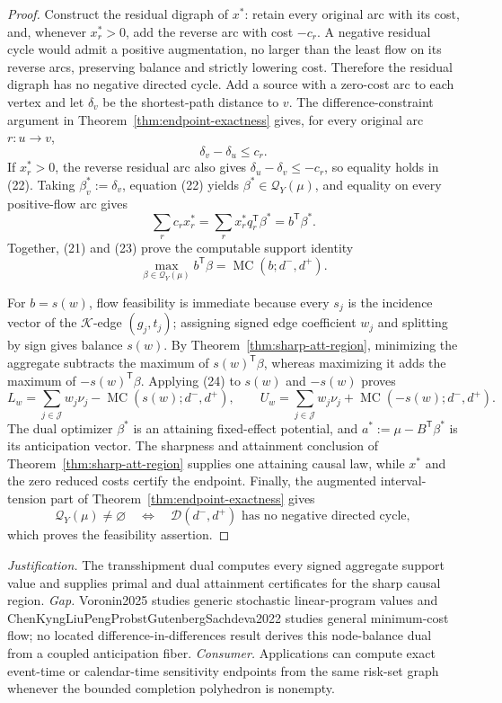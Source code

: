 \documentclass{article}
\begin{document}
\begin{proof}
Construct the residual digraph of \(x^*\): retain every original arc with its cost, and, whenever \(x_r^*>0\), add the reverse arc with cost \(-c_r\).  A negative residual cycle would admit a positive augmentation, no larger than the least flow on its reverse arcs, preserving balance and strictly lowering cost.  Therefore the residual digraph has no negative directed cycle.  Add a source with a zero-cost arc to each vertex and let \(\delta_v\) be the shortest-path distance to \(v\).  The difference-constraint argument in Theorem~\ref{thm:endpoint-exactness} gives, for every original arc \(r:u\to v\),
\[
 \delta_v-\delta_u\le c_r.
\tag{22}
\]
If \(x_r^*>0\), the reverse residual arc also gives \(\delta_u-\delta_v\le-c_r\), so equality holds in (22).  Taking \(\beta_v^*:=\delta_v\), equation (22) yields \(\beta^*\in\mathcal Q_Y(\mu)\), and equality on every positive-flow arc gives
\[
 \sum_r c_rx_r^*
 =\sum_r x_r^*q_r^{\mathsf T}\beta^*
 =b^{\mathsf T}\beta^*.
\tag{23}
\]
Together, (21) and (23) prove the computable support identity
\[
 \max_{\beta\in\mathcal Q_Y(\mu)}b^{\mathsf T}\beta
 =\operatorname{MC}(b;d^-,d^+).
\tag{24}
\]

For \(b=s(w)\), flow feasibility is immediate because every \(s_j\) is the incidence vector of the \(\mathcal K\)-edge \((g_j,t_j)\); assigning signed edge coefficient \(w_j\) and splitting by sign gives balance \(s(w)\).  By Theorem~\ref{thm:sharp-att-region}, minimizing the aggregate subtracts the maximum of \(s(w)^{\mathsf T}\beta\), whereas maximizing it adds the maximum of \(-s(w)^{\mathsf T}\beta\).  Applying (24) to \(s(w)\) and \(-s(w)\) proves
\[
 L_w=\sum_{j\in\mathcal J}w_j\nu_j-
 \operatorname{MC}(s(w);d^-,d^+),
 \qquad
 U_w=\sum_{j\in\mathcal J}w_j\nu_j+
 \operatorname{MC}(-s(w);d^-,d^+).
\tag{25}
\]
The dual optimizer \(\beta^*\) is an attaining fixed-effect potential, and \(a^*:=\mu-B^{\mathsf T}\beta^*\) is its anticipation vector.  The sharpness and attainment conclusion of Theorem~\ref{thm:sharp-att-region} supplies one attaining causal law, while \(x^*\) and the zero reduced costs certify the endpoint.  Finally, the augmented interval-tension part of Theorem~\ref{thm:endpoint-exactness} gives
\[
 \mathcal Q_Y(\mu)\ne\varnothing
 \quad\Longleftrightarrow\quad
 \mathcal D(d^-,d^+)\text{ has no negative directed cycle},
\]
which proves the feasibility assertion.
\end{proof}
\par\smallskip\noindent \textit{Justification.} The transshipment dual computes every signed aggregate support value and supplies primal and dual attainment certificates for the sharp causal region. \textit{Gap.} Voronin2025 studies generic stochastic linear-program values and ChenKyngLiuPengProbstGutenbergSachdeva2022 studies general minimum-cost flow; no located difference-in-differences result derives this node-balance dual from a coupled anticipation fiber. \textit{Consumer.} Applications can compute exact event-time or calendar-time sensitivity endpoints from the same risk-set graph whenever the bounded completion polyhedron is nonempty.
\end{document}
